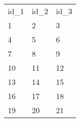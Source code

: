\begin{tabular}{lll}
	id\_1 & id\_2 & id\_3\\
	1 & 2 & 3\\
	4 & 5 & 6\\
	7 & 8 & 9\\
	10 & 11 & 12\\
	13 & 14 & 15\\
	16 & 17 & 18\\
	19 & 20 & 21\\
\end{tabular}
